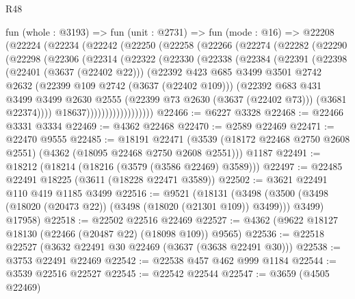 \begin{lexlean}{R48}
\begin{coremodule}
    fun (whole : @3193) =>
    fun (unit : @2731) =>
    fun (mode : @16) =>
    @22208
      (@22224
        (@22234
          (@22242
            (@22250
              (@22258
                (@22266
                  (@22274
                    (@22282
                      (@22290
                        (@22298
                          (@22306
                            (@22314
                              (@22322
                                (@22330
                                  (@22338
                                    (@22384
                                      (@22391
                                        (@22398
                                          (@22401 (@3637 (@22402 @22)))
                                          (@22392
                                            @423
                                            @685
                                            @3499
                                            @3501
                                            @2742
                                            @2632
                                            (@22399 @109 @2742 (@3637 (@22402 @109)))
                                            (@22392
                                              @683
                                              @431
                                              @3499
                                              @3499
                                              @2630
                                              @2555
                                              (@22399 @73 @2630 (@3637 (@22402 @73)))
                                              (@3681 @22374))))
                                        @18637))))))))))))))))))
@22466 := @6227 @3328
@22468 := @22466 @3331 @3334
@22469 := @4362 @22468
@22470 := @2589 @22469
@22471 := @22470 @9555
@22485 := @18191
    @22471
    (@3539 (@18172 @22468 @2750 @2608 @2551) (@4362 (@18095 @22468 @2750 @2608 @2551)))
    @1187
@22491 := @18212 (@18214 (@18216 (@3579 (@3586 @22469) @3589)))
@22497 := @22485 @22491 @18225 (@3611 (@18228 @22471 @3589))
@22502 := @3621 @22491 @110 @419 @1185 @3499
@22516 := @9521
    (@18131
      (@3498 (@3500 (@3498 (@18020 (@20473 @22)) (@3498 (@18020 (@21301 @109)) @3499))) @3499)
      @17958)
@22518 := @22502 @22516 @22469
@22527 := @4362 (@9622 @18127 @18130 (@22466 (@20487 @22) (@18098 @109)) @9565)
@22536 := @22518 @22527 (@3632 @22491 @30 @22469 (@3637 (@3638 @22491 @30)))
@22538 := @3753 @22491 @22469
@22542 := @22538 @457 @462 @999 @1184
@22544 := @3539 @22516 @22527
@22545 := @22542 @22544
@22547 := @3659 (@4505 @22469)

\end{coremodule}
\end{lexlean}
